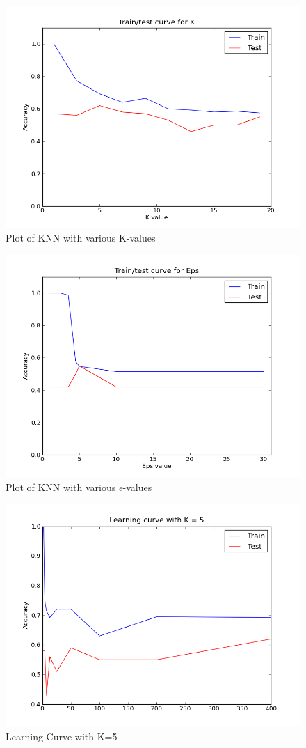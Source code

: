 \begin{figure}
	\caption{Plot of KNN with various K-values}
	\label{fig:kplot}
	\includegraphics[width=6.5in]{images/knn_k_plot.png}
\end{figure}

\begin{figure}
	\caption{Plot of KNN with various $\epsilon$-values}
	\label{fig:epsplot}
	\includegraphics[width=6.5in]{images/knn_eps_plot.png}
\end{figure}

\begin{figure}
	\caption{Learning Curve with K=5}
	\label{fig:learningplot}
	\includegraphics[width=6.5in]{images/knn_learning_curve.png}
\end{figure}
